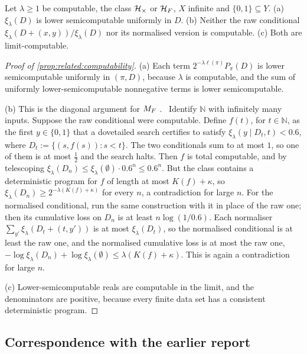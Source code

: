 \begin{proposition}\label{prop:related:computability}
Let $\lambda\ge1$ be computable, the class $\mathcal{H}_{\times}$ or $\mathcal{H}_{F}$, $X$ infinite and $\{0,1\}\subseteq Y$. (a) $\xi_\lambda(D)$ is lower semicomputable uniformly in $D$. (b) Neither the raw conditional $\xi_\lambda(D+(x,y))/\xi_\lambda(D)$ nor its normalised version is computable. (c) Both are limit-computable.
\end{proposition}

\begin{proof}[Proof of \cref{prop:related:computability}]
(a) Each term $2^{-\lambda\ell(\pi)}P_\pi(D)$ is lower semicomputable uniformly in $(\pi,D)$, because $\lambda$ is computable, and the sum of uniformly lower-semicomputable nonnegative terms is lower semicomputable.

(b) This is the diagonal argument for $M_{F}$ \citep[Proposition~A.10(c)]{claudeSFI2026fundamentals}.%
\ Identify $\mathbb N$ with infinitely many inputs. Suppose the raw conditional were computable. Define $f(t)$, for $t\in\mathbb N$, as the first $y\in\{0,1\}$ that a dovetailed search certifies to satisfy $\xi_\lambda(y\mid D_t,t)<0.6$, where $D_t:=\{(s,f(s)):s<t\}$. The two conditionals sum to at most $1$, so one of them is at most $\frac12$ and the search halts. Then $f$ is total computable, and by telescoping $\xi_\lambda(D_n)\le\xi_\lambda(\emptyset)\cdot0.6^n\le0.6^n$. But the class contains a deterministic program for $f$ of length at most $K(f)+\kappa$, so $\xi_\lambda(D_n)\ge2^{-\lambda(K(f)+\kappa)}$ for every $n$, a contradiction for large $n$. For the normalised conditional, run the same construction with it in place of the raw one; then its cumulative loss on $D_n$ is at least $n\log(1/0.6)$. Each normaliser $\sum_{y'}\xi_\lambda(D_t+(t,y'))$ is at most $\xi_\lambda(D_t)$, so the normalised conditional is at least the raw one, and the normalised cumulative loss is at most the raw one, $-\log\xi_\lambda(D_n)+\log\xi_\lambda(\emptyset)\le\lambda(K(f)+\kappa)$. This is again a contradiction for large $n$.

(c) Lower-semicomputable reals are computable in the limit, and the denominators are positive, because every finite data set has a consistent deterministic program.
\end{proof}

\subsection{Correspondence with the earlier report}\label{app:related:t5}

